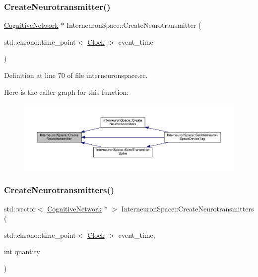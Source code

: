 \subsubsection{\texorpdfstring{Create\+Neurotransmitter()}{CreateNeurotransmitter()}}
{\footnotesize\ttfamily \hyperlink{class_cognitive_network}{Cognitive\+Network} $\ast$ Interneuron\+Space\+::\+Create\+Neurotransmitter (\begin{DoxyParamCaption}\item[{std\+::chrono\+::time\+\_\+point$<$ \hyperlink{universe_8h_a0ef8d951d1ca5ab3cfaf7ab4c7a6fd80}{Clock} $>$}]{event\+\_\+time }\end{DoxyParamCaption})}



Definition at line 70 of file interneuronspace.\+cc.

Here is the caller graph for this function\+:\nopagebreak
\begin{figure}[H]
\begin{center}
\leavevmode
\includegraphics[width=350pt]{class_interneuron_space_a26d98a0ae78ce363ab93e92cf0c973e7_icgraph}
\end{center}
\end{figure}
\mbox{\label{class_interneuron_space_af69f7190226d77a30a80d66d7c28e0ba}} 
\subsubsection{\texorpdfstring{Create\+Neurotransmitters()}{CreateNeurotransmitters()}}
{\footnotesize\ttfamily std\+::vector$<$ \hyperlink{class_cognitive_network}{Cognitive\+Network} $\ast$ $>$ Interneuron\+Space\+::\+Create\+Neurotransmitters (\begin{DoxyParamCaption}\item[{std\+::chrono\+::time\+\_\+point$<$ \hyperlink{universe_8h_a0ef8d951d1ca5ab3cfaf7ab4c7a6fd80}{Clock} $>$}]{event\+\_\+time,  }\item[{int}]{quantity }\end{DoxyParamCaption})}



